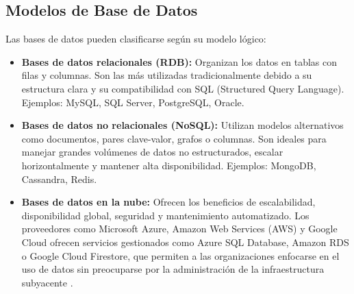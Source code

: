 \subsection{Modelos de Base de Datos}

Las bases de datos pueden clasificarse según su modelo lógico:

\begin{itemize}
    \item \textbf{Bases de datos relacionales (RDB):} Organizan los datos en tablas con filas y columnas. Son las más utilizadas tradicionalmente debido a su estructura clara y su compatibilidad con SQL (Structured Query Language). Ejemplos: MySQL, SQL Server, PostgreSQL, Oracle.

    \item \textbf{Bases de datos no relacionales (NoSQL):} Utilizan modelos alternativos como documentos, pares clave-valor, grafos o columnas. Son ideales para manejar grandes volúmenes de datos no estructurados, escalar horizontalmente y mantener alta disponibilidad. Ejemplos: MongoDB, Cassandra, Redis.

    \item \textbf{Bases de datos en la nube:} Ofrecen los beneficios de escalabilidad, disponibilidad global, seguridad y mantenimiento automatizado. Los proveedores como Microsoft Azure, Amazon Web Services (AWS) y Google Cloud ofrecen servicios gestionados como Azure SQL Database, Amazon RDS o Google Cloud Firestore, que permiten a las organizaciones enfocarse en el uso de datos sin preocuparse por la administración de la infraestructura subyacente  \cite{azureBD}.
\end{itemize}

